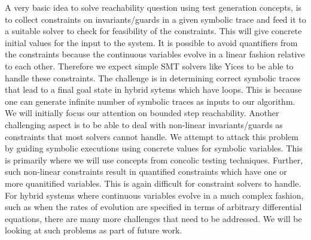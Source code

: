 A very basic idea to solve reachability question using test generation concepts, is to collect constraints on invariants/guards in a given symbolic trace and feed it to a suitable solver to check for feasibility of the constraints. This will give concrete initial values for the input to the system. It is possible to avoid quantifiers from the constraints because the continuous variables evolve in a linear fashion relative to each other. Therefore we expect simple SMT solvers like Yices to be able to handle these constraints. The challenge is in determining correct symbolic traces that lead to a final goal state in hybrid sytems which have loops. This is because one can generate infinite number of symbolic traces as inputs to our algorithm. We will initially focus our attention on bounded step reachability. Another challenging aspect is to be able to deal with non-linear invariants/guards as constraints that most solvers cannot handle. We attempt to attack this problem by guiding symbolic executions using concrete values for symbolic variables. This is primarily where we will use concepts from concolic testing techniques. Further, such non-linear constraints result in quantified constraints which have one or more quanitified variables. This is again difficult for constraint solvers to handle.  
For hybrid systems where continuous variables evolve in a much complex fashion, such as when the rates of evolution are specified in terms of arbitrary differential equations, there are many more challenges that need to be addressed. We will be looking at such problems as part of future work.  
